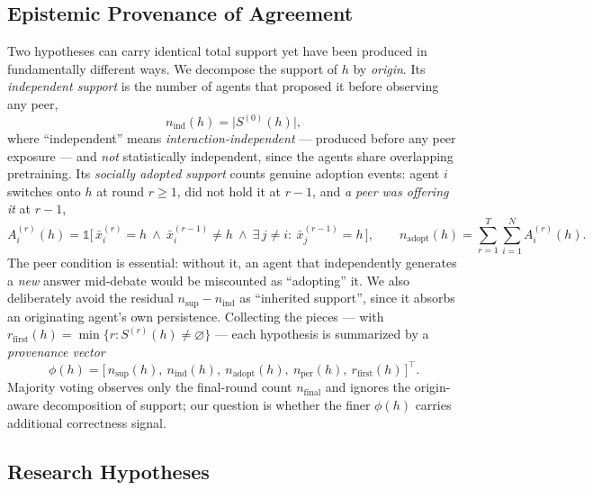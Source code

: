 \subsection{Epistemic Provenance of Agreement}
\label{subsec:provenance_definition}

Two hypotheses can carry identical total support yet have been produced in fundamentally different ways.
We decompose the support of $h$ by \emph{origin}. Its \emph{independent support} is the number of agents
that proposed it before observing any peer,
\begin{equation}
n_{\mathrm{ind}}(h)=\lvert S^{(0)}(h)\rvert ,
\end{equation}
where ``independent'' means \emph{interaction-independent} --- produced before any peer exposure --- and
\emph{not} statistically independent, since the agents share overlapping pretraining. Its
\emph{socially adopted support} counts genuine adoption events: agent $i$ switches onto $h$ at round
$r\ge 1$, did not hold it at $r-1$, and \emph{a peer was offering it} at $r-1$,
\begin{equation}
A_i^{(r)}(h)=\mathbb{1}\!\big[\,\bar{x}_i^{(r)}=h\ \wedge\ \bar{x}_i^{(r-1)}\ne h\ \wedge\ \exists\,j\ne i:\ \bar{x}_j^{(r-1)}=h\,\big],
\qquad
n_{\mathrm{adopt}}(h)=\sum_{r=1}^{T}\sum_{i=1}^{N} A_i^{(r)}(h) .
\label{eq:adopt}
\end{equation}
The peer condition is essential: without it, an agent that independently generates a \emph{new} answer
mid-debate would be miscounted as ``adopting'' it. We also deliberately avoid the residual
$n_{\mathrm{sup}}-n_{\mathrm{ind}}$ as ``inherited support'', since it absorbs an originating agent's own
persistence. Collecting the pieces --- with $r_{\mathrm{first}}(h)=\min\{r:S^{(r)}(h)\ne\varnothing\}$ ---
each hypothesis is summarized by a \emph{provenance vector}
\begin{equation}
\phi(h)=\big[\,n_{\mathrm{sup}}(h),\ n_{\mathrm{ind}}(h),\ n_{\mathrm{adopt}}(h),\ n_{\mathrm{per}}(h),\ r_{\mathrm{first}}(h)\,\big]^\top .
\label{eq:provvec}
\end{equation}
Majority voting observes only the final-round count $n_{\mathrm{final}}$ and ignores the origin-aware
decomposition of support; our question is whether the finer $\phi(h)$ carries additional correctness signal.

\subsection{Research Hypotheses}
\label{subsec:research_hypotheses}

